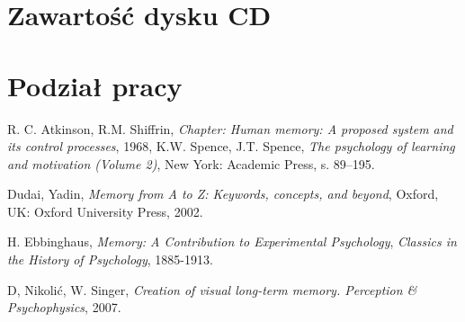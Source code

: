 \documentclass{pracamgr}
\begin{document}
\chapter{Zawartość dysku CD}

\chapter{Podział pracy}

\begin{thebibliography}{99}

 R. C. Atkinson, R.M. Shiffrin, \textit{Chapter: Human memory: A proposed system and its control processes}, 1968, K.W. Spence, J.T. Spence, \textit{The psychology of learning and motivation (Volume 2)}, New York: Academic Press, s. 89–195.

 Dudai, Yadin, \textit{Memory from A to Z: Keywords, concepts, and beyond}, Oxford, UK: Oxford University Press, 2002.

 H. Ebbinghaus, \textit{Memory: A Contribution to Experimental Psychology}, \textit{Classics in the History of Psychology}, 1885-1913.


 D, Nikolić, W. Singer, \textit{Creation of visual long-term memory. Perception \& Psychophysics}, 2007.


\end{thebibliography}
\end{document}
